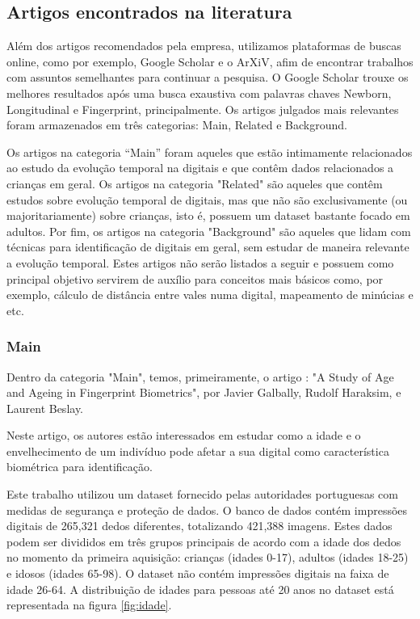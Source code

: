 \documentclass[12pt,a4paper]{article}
\begin{document}
\subsection{Artigos encontrados na literatura}
Além dos artigos recomendados pela empresa, utilizamos plataformas de buscas online, como por exemplo, Google Scholar e o ArXiV, afim de encontrar trabalhos com assuntos semelhantes para continuar a pesquisa. O Google Scholar trouxe os melhores resultados após uma busca exaustiva com palavras chaves Newborn, Longitudinal e Fingerprint, principalmente. Os artigos julgados mais relevantes foram armazenados em três categorias: Main, Related e Background.

Os artigos na categoria ``Main'' foram aqueles que estão intimamente relacionados ao estudo da evolução temporal na digitais e que contêm dados relacionados a crianças em geral. Os artigos na categoria "Related" são aqueles que contêm estudos sobre evolução temporal de digitais, mas que não são exclusivamente (ou majoritariamente) sobre crianças, isto é, possuem um dataset bastante focado em adultos. Por fim, os artigos na categoria "Background" são aqueles que lidam com técnicas para identificação de digitais em geral, sem estudar de maneira relevante a evolução temporal. Estes artigos não serão listados a seguir e possuem como principal objetivo servirem de auxílio para conceitos mais básicos como, por exemplo, cálculo de distância entre vales numa digital, mapeamento de minúcias e etc.

\subsubsection{Main}
Dentro da categoria "Main", temos, primeiramente, o artigo \cite{Galbally}: "A Study of Age and Ageing in Fingerprint Biometrics", por Javier Galbally, Rudolf Haraksim, e Laurent Beslay.

Neste artigo, os autores estão interessados em estudar como a idade e o envelhecimento de um indivíduo pode afetar a sua digital como característica biométrica para identificação.

Este trabalho utilizou um dataset fornecido pelas autoridades portuguesas com medidas de segurança e proteção de dados. O banco de dados contém impressões digitais de 265,321 dedos diferentes, totalizando 421,388 imagens. Estes dados podem ser divididos em três grupos principais de acordo com a idade dos dedos no momento da primeira aquisição: crianças (idades 0-17), adultos (idades 18-25) e idosos (idades 65-98). O dataset não contém impressões digitais na faixa de idade 26-64. A distribuição de idades para pessoas até 20 anos no dataset está representada na figura \ref{fig:idade}.
\end{document}
